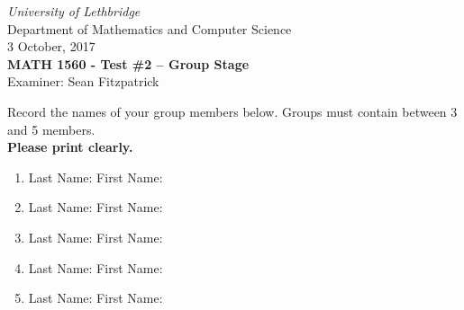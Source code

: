 \documentclass[12pt]{article}
\newcommand{\skipline}{\vspace{12pt}}
\begin{document}
\author{Instructor: Sean Fitzpatrick}
\thispagestyle{plain}
\begin{center}
\emph{University of Lethbridge}\\
Department of Mathematics and Computer Science\\
3 October, 2017\\
{\bf MATH 1560 - Test \#2 -- Group Stage}\\
Examiner: Sean Fitzpatrick
\end{center}

\skipline \skipline \skipline \noindent \skipline

Record the names of your group members below. Groups must contain between 3 and 5 members. \\

\textbf{Please print clearly.}

\skipline

\begin{enumerate}
\item Last Name:\underline{\hspace{200pt}} \quad First Name:\underline{\hspace{140pt}}

\skipline\skipline

\item Last Name:\underline{\hspace{200pt}} \quad First Name:\underline{\hspace{140pt}}

\skipline\skipline

\item Last Name:\underline{\hspace{200pt}} \quad First Name:\underline{\hspace{140pt}}

\skipline\skipline

\item Last Name:\underline{\hspace{200pt}} \quad First Name:\underline{\hspace{140pt}}

\skipline\skipline

\item Last Name:\underline{\hspace{200pt}} \quad First Name:\underline{\hspace{140pt}}

\end{enumerate}
%
\end{document}
